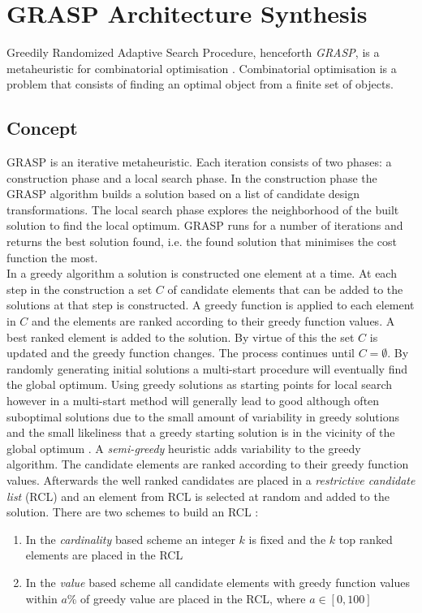 \section{GRASP Architecture Synthesis}
\label{sec:grasp}
Greedily Randomized Adaptive Search Procedure, henceforth \emph{GRASP}, is a metaheuristic for combinatorial optimisation \cite{grasp}. Combinatorial optimisation is a problem that consists of finding an optimal object from a finite set of objects.

\subsection{Concept}
GRASP is an iterative metaheuristic. Each iteration consists of two phases: a construction phase and a local search phase. In the construction phase the GRASP algorithm builds a solution based on a list of candidate design transformations. The local search phase explores the neighborhood of the built solution to find the local optimum. GRASP runs for a number of iterations and returns the best solution found, i.e. the found solution that minimises the cost function the most.\\
In a greedy algorithm a solution is constructed one element at a time. At each step in the construction a set $C$ of candidate elements that can be added to the solutions at that step is constructed. A greedy function is applied to each element in $C$ and the elements are ranked according to their greedy function values. A best ranked element is added to the solution. By virtue of this the set $C$ is updated and the greedy function changes. The process continues until $C = \emptyset$. By randomly generating initial solutions a multi-start procedure will eventually find the global optimum. Using greedy solutions as starting points for local search however in a multi-start method will generally lead to good although often suboptimal solutions due to the small amount of variability in greedy solutions and the small likeliness that a greedy starting solution is in the vicinity of the global optimum \cite{grasp}. A \emph{semi-greedy} heuristic adds variability to the greedy algorithm. The candidate elements are ranked according to their greedy function values. Afterwards the well ranked candidates are placed in a \emph{restrictive candidate list} (RCL) and an element from RCL is selected at random and added to the solution. There are two schemes to build an RCL \cite{grasp}:
\begin{enumerate}
\item In the \emph{cardinality} based scheme an integer $k$ is fixed and the $k$ top ranked elements are placed in the RCL

\item In the \emph{value} based scheme all candidate elements with greedy function values within $a$\% of greedy value are placed in the RCL, where $a \in [0, 100]$

\end{enumerate}

